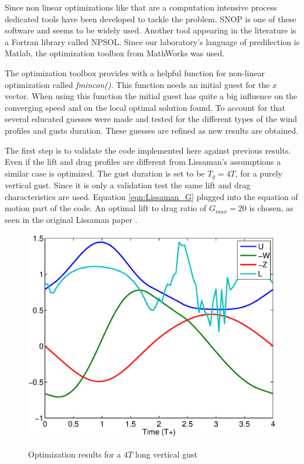 \par Since non linear optimizations like that are a computation intensive process dedicated tools have been developed to tackle the problem.
SNOP is one of these software and seems to be widely used.
Another tool appearing in the literature is a Fortran library called NPSOL.
Since our laboratory's language of predilection is Matlab, the optimization toolbox from MathWorks was used.

\par The optimization toolbox provides with a helpful function for non-linear optimization called \emph{fmincon()}.
This function needs an initial guest for the $x$ vector.
When using this function the initial guest has quite a big influence on the converging speed and on the local optimal solution found.
To account for that several educated guesses were made and tested for the different types of the wind profiles and gusts duration.
These guesses are refined as new results are obtained.


 \label{sec:results_QS}

The first step is to validate the code implemented here against previous results. 
Even if the lift and drag profiles are different from Lissaman's assumptions a similar case is optimized.
The gust duration is set to be $T_g=4 T$, for a purely vertical gust.
Since it is only a validation test the same lift and drag characteristics are used. Equation \ref{eqn:Lissaman_G} plugged into the equation of motion part of the code. An optimal lift to drag ratio of $G_{max}=20$ is chosen, as seen in the original Lissaman paper \cite{Lissaman2007neutral}.

\begin{figure}[ht]
  \begin{center}	
    \scalebox{0.8}
    {\includegraphics{./Figures/Windtype=1_Tg=4_Wg=0p129_quad_G=20.eps}}
  \end{center}
  \caption{Optimization results for a $4T$ long vertical gust}
  \label{fig:Validation_optimization}
\end{figure}

